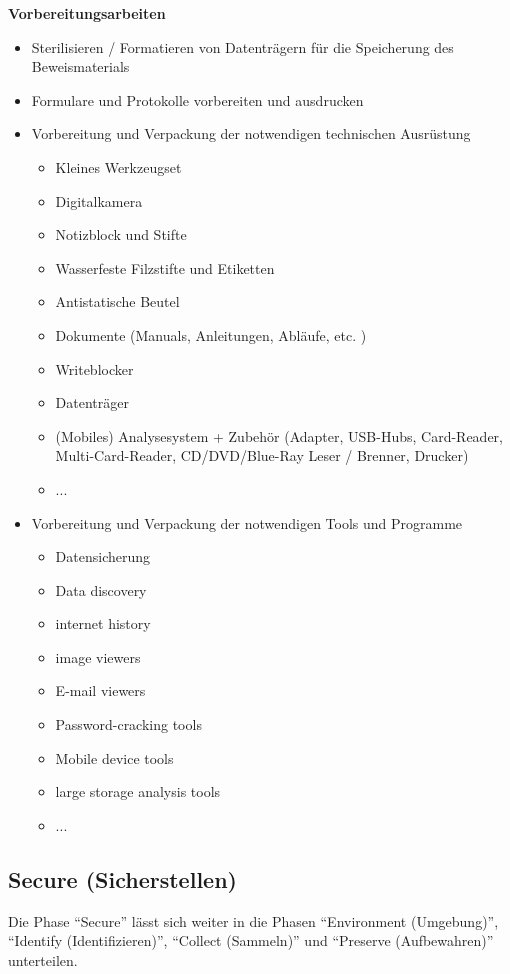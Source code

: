 \textbf{Vorbereitungsarbeiten}
\begin{itemize}
\item Sterilisieren / Formatieren von Datenträgern für die Speicherung des Beweismaterials
\item Formulare und Protokolle vorbereiten und ausdrucken
\item Vorbereitung und Verpackung der notwendigen technischen Ausrüstung \\
\begin{itemize}
\item Kleines Werkzeugset
\item Digitalkamera
\item Notizblock und Stifte
\item Wasserfeste Filzstifte und Etiketten
\item Antistatische Beutel
\item Dokumente (Manuals, Anleitungen, Abläufe, etc. )
\item Writeblocker
\item Datenträger
\item (Mobiles) Analysesystem + Zubehör (Adapter, USB-Hubs, Card-Reader, Multi-Card-Reader, CD/DVD/Blue-Ray Leser / Brenner, Drucker)
\item ...
\end{itemize}
\item Vorbereitung und Verpackung der notwendigen Tools und Programme \\
\begin{itemize}
\item Datensicherung 
\item Data discovery
\item internet history
\item image viewers
\item E-mail viewers
\item Password-cracking tools
\item Mobile device tools
\item large storage analysis tools
\item ...
\end{itemize}
\end{itemize}

\subsection{Secure (Sicherstellen)}
Die Phase "`Secure"' lässt sich weiter in die Phasen "`Environment (Umgebung)"', "`Identify (Identifizieren)"', "`Collect (Sammeln)"' und "`Preserve (Aufbewahren)"' unterteilen.


